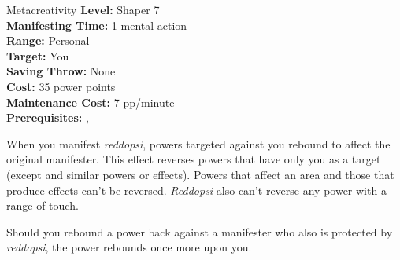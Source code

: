 {Metacreativity}
{
	\textbf{Level:}
	Shaper 7\\
	\textbf{Manifesting Time:}
	1 mental action\\
	\textbf{Range:}
	Personal\\
	\textbf{Target:}
	You\\
	\textbf{Saving Throw:}
	None\\
	\textbf{Cost:}
	35 power points\\
	\textbf{Maintenance Cost:}
	7 pp/minute\\
	\textbf{Prerequisites:}
	, \\
}
{
	When you manifest \emph{reddopsi}, powers targeted against you rebound to affect the original manifester. This effect reverses powers that have only you as a target (except  and similar powers or effects). Powers that affect an area and those that produce effects can't be reversed. \emph{Reddopsi} also can't reverse any power with a range of touch.

	Should you rebound a power back against a manifester who also is protected by \emph{reddopsi}, the power rebounds once more upon you.
}